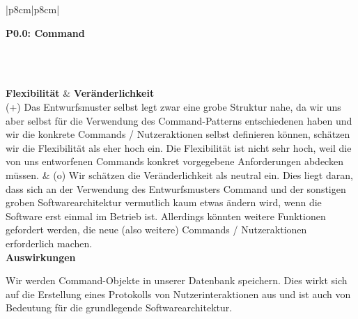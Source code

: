\documentclass[enabledeprecatedfontcommands,fontsize=11pt,paper=a4,twoside]{scrartcl}
\newcounter{one}
\newcounter{two}[one]
\newcommand{\tone}{0\theone}
\newcommand{\two}{\stepcounter{two}0\thetwo}
\begin{document}
\newpage
\begin{tabular} {|p{8cm}|p{8cm}|}
	\hline
	 {\parbox{16cm}{\textbf{\hypertarget{i}{P\tone.\two}: Command }} } \\ \hline\hline 
	\rule{0pt}{14.5ex}\\  \hline
	\textbf{Flexibilität}  & \textbf{Veränderlichkeit} \\
	(+) Das Entwurfsmuster selbst legt zwar eine grobe Struktur nahe, da wir uns aber selbst für die Verwendung des Command-Patterns entschiedenen haben und wir die konkrete Commands / Nutzeraktionen selbst definieren können, schätzen wir die Flexibilität als eher hoch ein. Die Flexibilität ist nicht sehr hoch, weil die von uns entworfenen Commands konkret vorgegebene Anforderungen abdecken müssen. & 
	(o) Wir schätzen die Veränderlichkeit als neutral ein. Dies liegt daran, dass sich an der Verwendung des Entwurfsmusters Command und der sonstigen groben Softwarearchitektur vermutlich kaum etwas ändern wird, wenn die Software erst einmal im Betrieb ist. Allerdings könnten weitere Funktionen gefordert werden, die neue (also weitere) Commands / Nutzeraktionen erforderlich machen.\\
	\hline
	 {\textbf{Auswirkungen}} \\
	 {\parbox{16cm}{Wir werden Command-Objekte in unserer Datenbank speichern. Dies wirkt sich auf die Erstellung eines Protokolls von Nutzerinteraktionen aus und ist auch von Bedeutung für die grundlegende Softwarearchitektur.}}\\ [3ex]\hline
\end{tabular}
\end{document}
